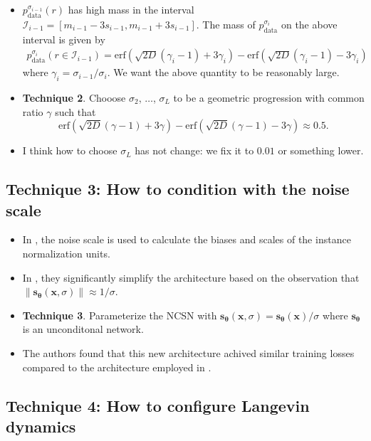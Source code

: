 \documentclass[10pt]{article}
\newcommand{\ve}[1]{\mathbf{#1}}
\newcommand{\mrm}[1]{\mathrm{#1}}
\newcommand{\ves}[1]{\boldsymbol{#1}}
\newcommand{\mcal}[1]{\mathcal{#1}}
\begin{document}
\begin{itemize}
  \item $p_{\mrm{data}}^{\sigma_{i-1}}(r)$ has high mass in the interval $\mcal{I}_{i-1} = [m_{i-1} - 3s_{i-1}, m_{i-1} + 3s_{i-1}]$. The mass of $p_{\mrm{data}}^{\sigma_i}$ on the above interval is given by
  \begin{align*}
    p_{\mrm{data}}^{\sigma_i}(r \in \mcal{I}_{i-1}) 
    = \mrm{erf}(\sqrt{2D}(\gamma_i - 1) + 3\gamma_i) - \mrm{erf}(\sqrt{2D}(\gamma_i - 1) - 3\gamma_i)
  \end{align*}
  where $\gamma_i = \sigma_{i-1} / \sigma_i$. We want the above quantity to be reasonably large.

  \item {\bf Technique 2}. Chooose $\sigma_2$, $\dotsc$, $\sigma_L$ to be a geometric progression with common ratio $\gamma$ such that $$\mrm{erf}(\sqrt{2D}(\gamma - 1) + 3\gamma) - \mrm{erf}(\sqrt{2D}(\gamma - 1) - 3\gamma) \approx 0.5.$$
  
  \item I think how to choose $\sigma_L$ has not change: we fix it to $0.01$ or something lower.
\end{itemize}

\subsection{Technique 3: How to condition with the noise scale}

\begin{itemize}
  \item In \cite{Song:2019}, the noise scale is used to calculate the biases and scales of the instance normalization units.
  
  \item In \cite{Song:2020}, they significantly simplify the architecture based on the observation that $\| \ve{s}_{\ves{\theta}}(\ve{x},\sigma)  \| \approx 1/\sigma$.
  
  \item {\bf Technique 3}. Parameterize the NCSN with $\ve{s}_{\ves{\theta}}(\ve{x},\sigma) = \ve{s}_{\ves{\theta}}(\ve{x})/\sigma$ where $\ve{s}_{\ves{\theta}}$ is an unconditonal network.

  \item The authors found that this new architecture achived similar training losses compared to the architecture employed in \cite{Song:2019}.
\end{itemize}

\subsection{Technique 4: How to configure Langevin dynamics}
\end{document}
